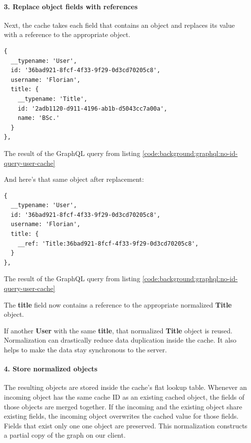 \paragraph{3. Replace object fields with references}

Next, the cache takes each field that contains an object and replaces its value with a reference to the appropriate object.

\ifshowListings
\begin{listing}[H]
\begin{verbatim}
{
  __typename: 'User',
  id: '36bad921-8fcf-4f33-9f29-0d3cd70205c8',
  username: 'Florian',
  title: {
    __typename: 'Title',
    id: '2adb1120-d911-4196-ab1b-d5043cc7a00a',
    name: 'BSc.'
  }
}, 
\end{verbatim}
\caption{The result of the GraphQL query from listing \ref{code:background:graphql:no-id-query-user-cache}}
\end{listing}
\fi

And here's that same object after replacement:

\ifshowListings
\begin{listing}[H]
\begin{verbatim}
{
  __typename: 'User',
  id: '36bad921-8fcf-4f33-9f29-0d3cd70205c8',
  username: 'Florian',
  title: {
    __ref: 'Title:36bad921-8fcf-4f33-9f29-0d3cd70205c8',
  }
}, 
\end{verbatim}
\caption{The result of the GraphQL query from listing \ref{code:background:graphql:no-id-query-user-cache}}
\end{listing}
\fi

The \textbf{title} field now contains a reference to the appropriate normalized \textbf{Title} object.

If another \textbf{User} with the same \textbf{title}, that normalized \textbf{Title} object is reused. Normalization can drastically reduce data duplication inside the cache. It also helps to make the data stay synchronous to the server.

\paragraph{4. Store normalized objects} 

The resulting objects are stored inside the cache's flat lookup table. Whenever an incoming object has the same cache ID as an existing cached object, the fields of those objects are merged together. If the incoming and the existing object share existing fields, the incoming object overwrites the cached value for those fields. Fields that exist only one one object are preserved. This normalization constructs a partial copy of the graph on our client. \cite{misc:-:background:graphql:apollo-client-cache-overview}

